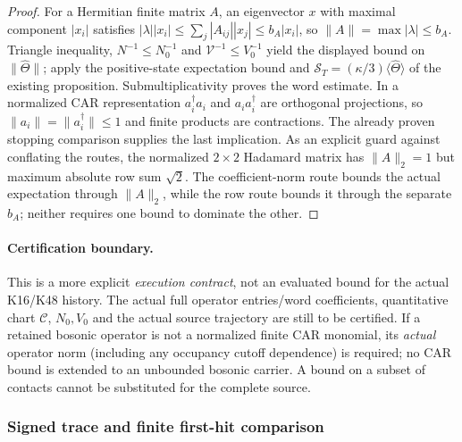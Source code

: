 \documentclass[12pt,a4paper]{article}
\begin{document}
\begin{proof}
For a Hermitian finite matrix $A$, an eigenvector $x$ with maximal
component $|x_i|$ satisfies
$|\lambda||x_i|\le\sum_j|A_{ij}||x_j|
 \le b_A|x_i|$, so $\|A\|=\max|\lambda|\le b_A$.
Triangle inequality, $N^{-1}\le N_0^{-1}$ and
$\mathcal V^{-1}\le V_0^{-1}$ yield the displayed bound on
$\|\widehat\Theta\|$; apply the positive-state expectation bound and
$\mathcal S_T=(\kappa/3)\langle\widehat\Theta\rangle$ of the
existing proposition. Submultiplicativity proves the word estimate.
In a normalized CAR representation $a_i^\dagger a_i$ and
$a_i a_i^\dagger$ are orthogonal projections, so
$\|a_i\|=\|a_i^\dagger\|\le1$ and finite products are contractions.
The already proven stopping comparison supplies the last implication.
As an explicit guard against conflating the routes, the normalized
$2\times2$ Hadamard matrix has \(\|A\|_2=1\) but maximum absolute
row sum \(\sqrt2\). The coefficient-norm route bounds the actual
expectation through \(\|A\|_2\), while the row route bounds it
through the separate \(b_A\); neither requires one bound to dominate
the other.
\end{proof}
\paragraph{Certification boundary.}
This is a more explicit \emph{execution contract}, not an evaluated bound for
the actual K16/K48 history. The actual full operator entries/word
coefficients, quantitative chart $\mathscr C$, $N_0,V_0$ and the actual
source trajectory are still to be certified. If a retained bosonic
operator is not a normalized finite CAR monomial, its \emph{actual}
operator norm (including any occupancy cutoff dependence) is required;
no CAR bound is extended to an unbounded bosonic carrier. A bound on a
subset of contacts cannot be substituted for the complete source.




\subsubsection{Signed trace and finite first-hit comparison}
\label{p8:sec:v2189-c06-signed-trace}
\end{document}
